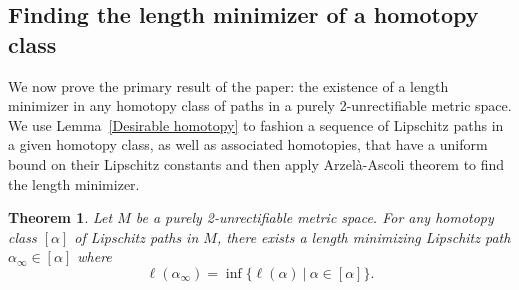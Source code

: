\documentclass{article}
\newtheorem{theorem}{Theorem}[section]
\theoremstyle{definition}
\theoremstyle{remark}
\newcommand{\length}[1]{\ell}%
\newcommand{\core}[1]{{#1}_\infty}
\begin{document}
\subsection{Finding the length minimizer of a homotopy class}

We now prove the primary result of the paper: the existence of a length minimizer in any homotopy class of paths in a purely 2-unrectifiable metric space. We use Lemma~\ref{Desirable homotopy} to fashion a sequence of Lipschitz paths in a given homotopy class, as well as associated homotopies, that have a uniform bound on their Lipschitz constants and then apply Arzel\`{a}-Ascoli theorem to find the length minimizer. 




\begin{theorem}\label{existence of length minimizer}
Let $M$ be a purely 2-unrectifiable metric space. For any homotopy class $[\alpha]$ of Lipschitz paths in $M$, there exists a length minimizing Lipschitz path $\core{\alpha}\in[\alpha]$ where
\[
\length{M}(\core{\alpha})=\inf\{\length{M}(\alpha)~|~\alpha\in[\alpha]\}.
\]
\end{theorem}
\end{document}
